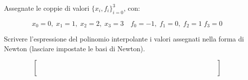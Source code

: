Assegnate le coppie di valori $\{x_i,f_i \}_{i=0}^3$, con:

\[ x_0=0, \; x_1=1, \; x_2=2, \; x_3=3 \quad f_0=-1, \; f_1=0, \; f_2=1 \; f_3=0 \]

\noindent Scrivere l'espressione del polinomio interpolante i 
valori assegnati nella forma di Newton (lasciare impostate le 
basi di Newton).

\[
\left [
\begin{array}{cccccccccccccc}
\quad &  \quad & \quad &  \quad &  \quad &  \quad &  \quad  \quad & \quad &  \quad & \quad &  \quad & \quad & \quad &  \quad  \\
\quad &  \quad & \quad &  \quad &  \quad &  \quad &  \quad  \quad & \quad &  \quad & \quad &  \quad & \quad & \quad &  \quad \\
\quad &  \quad & \quad &  \quad &  \quad &  \quad &  \quad  \quad
& \quad &  \quad & \quad &  \quad & \quad & \quad &  \quad \\
  \quad &  \quad & \quad &  \quad &  \quad &  \quad &  \quad  \quad & \quad &  \quad & \quad &  \quad & \quad & \quad &  \quad  \\
  \quad &  \quad & \quad &  \quad &  \quad &  \quad &  \quad  \quad & \quad &  \quad & \quad &  \quad & \quad & \quad &  \quad  
\end{array}\right]
\]
